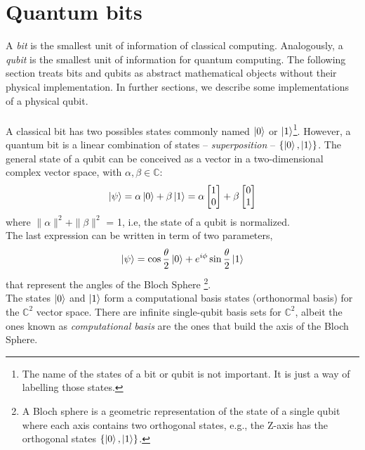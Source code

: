 \section{Quantum bits}
A \textit{bit} is the smallest unit of information of classical computing. Analogously, a \textit{qubit} is the smallest unit of information for quantum computing. The following section treats bits and qubits as abstract mathematical objects without their physical implementation. In further sections, we describe some implementations of a physical qubit.\\\\
A classical bit has two possibles states commonly named $\ket{0}$ or $\ket{1}$\footnote{The name of the states of a bit or qubit is not important. It is just a way of labelling those states.}. However, a quantum bit is a linear combination of states -- \textit{superposition} -- $\{\ket{0}, \ket{1}\}$. The general state of a qubit can be conceived as a vector in a two-dimensional complex vector space, with $\alpha, \beta \in \mathbb{C}$:
\begin{equation}
    \ket{\psi} = \alpha \ket{0} + \beta \ket{1} = \alpha \begin{bmatrix}
           1 \\
           0 
         \end{bmatrix}
         +
         \beta
         \begin{bmatrix}
           0 \\
           1 
         \end{bmatrix}
\end{equation}
where $\|\alpha\|^{2} + \|\beta\|^{2}$ = 1, i.e, the state of a qubit is normalized.\\
The last expression can be written in term of two parameters,
\begin{equation}
    \ket{\psi} = \cos{\frac{\theta}{2}}\ket{0} + e^{i\phi}\sin{\frac{\theta}{2}}\ket{1}
\end{equation}
that represent the angles of the Bloch Sphere \footnote{A Bloch sphere is a geometric representation of the state of a single qubit where each axis contains two orthogonal states, e.g., the Z-axis has the orthogonal states $\{\ket{0},\ket{1}\}$.}.\\
The states $\ket{0}$ and $\ket{1}$ form a computational basis states (orthonormal basis) for the $\mathbb{C}^{2}$ vector space. There are infinite single-qubit basis sets for $\mathbb{C}^{2}$, albeit the ones known as \textit{computational basis} are the ones that build the axis of the Bloch Sphere.

